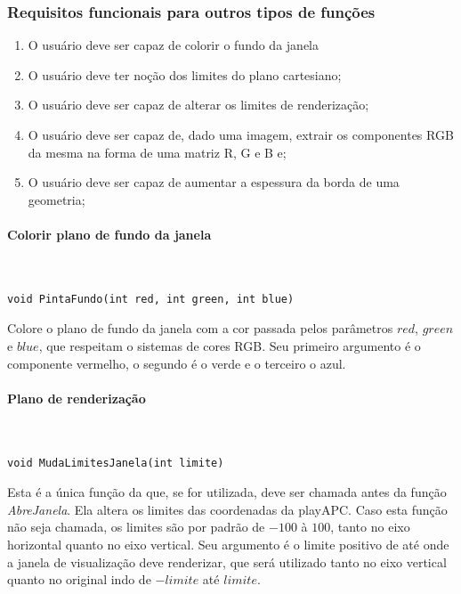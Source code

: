  \subsubsection{Requisitos funcionais para outros tipos de funções}
 \begin{enumerate}
 \item O usuário deve ser capaz de colorir o fundo da janela
 \item O usuário deve ter noção dos limites do plano cartesiano;
 \item O usuário deve ser capaz de alterar os limites de renderização;
 \item O usuário deve ser capaz de, dado uma imagem, extrair os componentes RGB da mesma na forma de uma matriz R, G e B e;
 \item O usuário deve ser capaz de aumentar a espessura da borda de uma geometria;
 \end{enumerate}

  \paragraph{Colorir plano de fundo da janela}\mbox{}\\

  \begin{lstlisting}
void PintaFundo(int red, int green, int blue)
\end{lstlisting}
Colore o plano de fundo da janela com a cor passada pelos parâmetros $red$, $green$ e $blue$, que respeitam o sistemas de cores RGB. Seu primeiro argumento é o componente vermelho, o segundo é o verde e o terceiro o azul.

 \paragraph{Plano de renderização}\mbox{}\\

  \begin{lstlisting}
void MudaLimitesJanela(int limite)
\end{lstlisting}
Esta é a única função da \playAPC{} que, se for utilizada, deve ser chamada antes da função \emph{AbreJanela}. Ela altera os limites das coordenadas da playAPC. Caso esta função não seja chamada, os limites são por padrão de $-100$ à $100$, tanto no eixo horizontal quanto no eixo vertical. Seu argumento é o limite positivo de até onde a janela de visualização deve renderizar, que será utilizado tanto no eixo vertical quanto no original indo de $-limite$ até $limite$.

